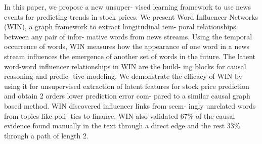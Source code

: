 In this paper, we propose a new unsuper- vised learning framework to use news events for predicting trends in stock prices. We present Word Influencer Networks (WIN), a graph framework to extract longitudinal tem- poral relationships between any pair of infor- mative words from news streams. Using the temporal occurrence of words, WIN measures how the appearance of one word in a news stream influences the emergence of another set of words in the future. The latent word-word influencer relationships in WIN are the build- ing blocks for causal reasoning and predic- tive modeling. We demonstrate the efficacy of WIN by using it for unsupervised extraction of latent features for stock price prediction and obtain 2 orders lower prediction error com- pared to a similar causal graph based method. WIN discovered influencer links from seem- ingly unrelated words from topics like poli- tics to finance. WIN also validated 67\% of the causal evidence found manually in the text through a direct edge and the rest 33\% through a path of length 2.
